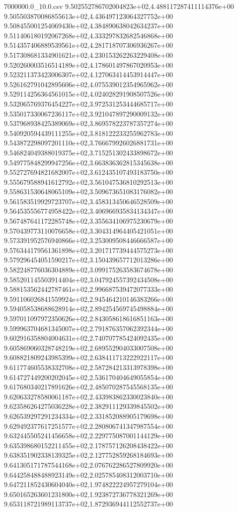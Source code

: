 \begin{filecontents*}{7000000.0_10.0.csv}
9.502552786702004823e+02,4.488117287411114376e+00
9.505503870086855613e+02,4.436497123064327752e+00
9.508455001254069430e+02,4.384890638042634237e+00
9.511406180192067268e+02,4.333297832682546868e+00
9.514357406889539561e+02,4.281718707306936267e+00
9.517308681334901621e+02,4.230153262263229408e+00
9.520260003516514189e+02,4.178601497867020953e+00
9.523211373423006307e+02,4.127063414453914447e+00
9.526162791042895606e+02,4.075539012354965962e+00
9.529114256364561015e+02,4.024028291908507526e+00
9.532065769376454227e+02,3.972531253444685717e+00
9.535017330067236117e+02,3.921047897290009132e+00
9.537968938425389069e+02,3.869578223787357274e+00
9.540920594439111255e+02,3.818122233255962783e+00
9.543872298097201110e+02,3.766679926026881731e+00
9.546824049388019375e+02,3.715251302433898672e+00
9.549775848299947256e+02,3.663836362815345638e+00
9.552727694821682007e+02,3.612435107493183750e+00
9.555679588941612792e+02,3.561047536810292513e+00
9.558631530648065109e+02,3.509673651083176082e+00
9.561583519929723707e+02,3.458313450646528509e+00
9.564535556774958422e+02,3.406966935834134347e+00
9.567487641172285748e+02,3.355634106975230679e+00
9.570439773110076658e+02,3.304314964405421051e+00
9.573391952576940866e+02,3.253009508446666587e+00
9.576344179561361898e+02,3.201717739444575273e+00
9.579296454051590217e+02,3.150439657712013286e+00
9.582248776036304889e+02,3.099175263583674678e+00
9.585201145503914404e+02,3.047924557392434508e+00
9.588153562442787461e+02,2.996687539472077333e+00
9.591106026841559924e+02,2.945464210146383266e+00
9.594058538688628914e+02,2.894254569745498884e+00
9.597011097972350626e+02,2.843058618616851163e+00
9.599963704681345007e+02,2.791876357062392344e+00
9.602916358804004631e+02,2.740707785424092435e+00
9.605869060328748219e+02,2.689552904033007508e+00
9.608821809243985399e+02,2.638411713222922117e+00
9.611774605538332708e+02,2.587284213313978398e+00
9.614727449200202045e+02,2.536170404649055854e+00
9.617680340217891626e+02,2.485070287545568135e+00
9.620633278580061187e+02,2.433983862330023840e+00
9.623586264275036228e+02,2.382911129339845502e+00
9.626539297291234334e+02,2.331852088905179698e+00
9.629492377617251577e+02,2.280806741347987554e+00
9.632445505241456658e+02,2.229775087001144129e+00
9.635398680152211455e+02,2.178757126208438422e+00
9.638351902338139325e+02,2.127752859268184693e+00
9.641305171787544168e+02,2.076762286527809920e+00
9.644258488488923149e+02,2.025785408312003710e+00
9.647211852430604040e+02,1.974822224957279104e+00
9.650165263601231800e+02,1.923872736778321269e+00
9.653118721989113737e+02,1.872936944112552737e+00

\end{filecontents*}
